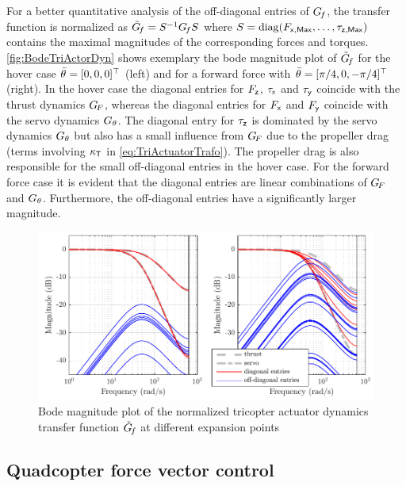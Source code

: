 For a better quantitative analysis of the off-diagonal entries of $G_{\hspace{-0.3ex}f}$, the transfer function is normalized as $\tilde{G}_{\hspace{-0.3ex}f} = S^{-1} G_{\hspace{-0.3ex}f} S $ where $S = \operatorname{diag}(F_{\mathsf{x,Max}}, \ldots, \tau_{\mathsf{z,Max}})$ contains the maximal magnitudes of the corresponding forces and torques.
\autoref{fig:BodeTriActorDyn} shows exemplary the bode magnitude plot of $\tilde{G}_{\hspace{-0.3ex}f}$ for the hover case $\bar{\theta}_{} = [0,0,0]^\top$ (left) and for a forward force with $\bar{\theta}_{} = [\pi / 4,0,-\pi / 4]^\top$ (right).
In the hover case the diagonal entries for $F_{\mathsf{z}}$, $\tau_{\mathsf{x}}$ and $\tau_{\mathsf{y}}$ coincide with the thrust dynamics $G_{\hspace{-0.3ex}F}$, whereas the diagonal entries for $F_{\mathsf{x}}$ and $F_{\mathsf{y}}$ coincide with the servo dynamics $G_{\theta}$.
The diagonal entry for $\tau_{\mathsf{z}}$ is dominated by the servo dynamics $G_{\theta}$ but also has a small influence from $G_{\hspace{-0.3ex}F}$ due to the propeller drag (terms involving $\kappa_{\mathsf{T}}$ in \eqref{eq:TriActuatorTrafo}).
The propeller drag is also responsible for the small off-diagonal entries in the hover case.
For the forward force case it is evident that the diagonal entries are linear combinations of $G_{\hspace{-0.3ex}F}$ and $G_{\theta}$.
Furthermore, the off-diagonal entries have a significantly larger magnitude.

\begin{figure}
 \centering
 \includegraphics{graphics/TriActuatorDynamics/BodeTriActorDyn.pdf}
 \caption{Bode magnitude plot of the normalized tricopter actuator dynamics transfer function $\tilde{G}_{\hspace{-0.3ex}f}$ at different expansion points}
 \label{fig:BodeTriActorDyn}
\end{figure}


\subsection{Quadcopter force vector control}
